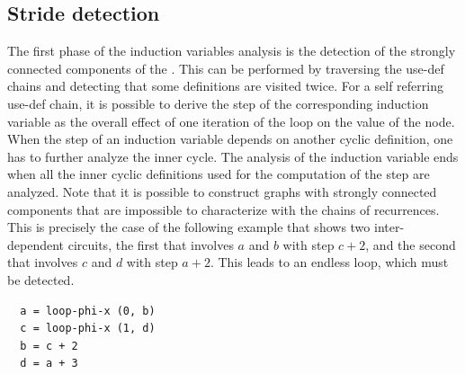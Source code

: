 \subsection{Stride detection}

The first phase of the induction variables analysis is the detection
of the strongly connected components of the \SSA{}.  This can be
performed by traversing the use-def \SSA{} chains and detecting that
some definitions are visited twice.  For a self referring use-def
chain, it is possible to derive the step of the corresponding
induction variable as the overall effect of one iteration of the loop
on the value of the \loopphi{} node.  When the step of an induction
variable depends on another cyclic definition, one has to further
analyze the inner cycle.  The analysis of the induction variable ends
when all the inner cyclic definitions used for the computation of the
step are analyzed. Note that it is possible to construct \SSA{} graphs
with strongly connected components that are impossible to characterize
with the chains of recurrences. This is precisely the case of the
following example that shows two inter-dependent circuits, the first
that involves $a$ and $b$ with step $c+2$, and the second that
involves $c$ and $d$ with step $a+2$. This leads to an endless loop,
which must be detected.
\begin{verbatim}
  a = loop-phi-x (0, b)
  c = loop-phi-x (1, d)
  b = c + 2
  d = a + 3
\end{verbatim}

